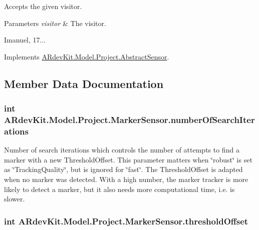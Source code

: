 Accepts the given visitor. 


\begin{DoxyParams}{Parameters}
{\em visitor} & The visitor.\\
\hline
\end{DoxyParams}


Imanuel, 17... 

Implements \hyperlink{class_a_rdev_kit_1_1_model_1_1_project_1_1_abstract_sensor_a4ff825b76bdd9f01a93ca670d02c219c}{A\-Rdev\-Kit.\-Model.\-Project.\-Abstract\-Sensor}.



\subsection{Member Data Documentation}
\hypertarget{class_a_rdev_kit_1_1_model_1_1_project_1_1_marker_sensor_aaefe31873d64fdae7c9518487f0ad0d1}{
\subsubsection[{number\-Of\-Search\-Iterations}]{\setlength{\rightskip}{0pt plus 5cm}int A\-Rdev\-Kit.\-Model.\-Project.\-Marker\-Sensor.\-number\-Of\-Search\-Iterations\hspace{0.3cm}{\ttfamily [protected]}}}\label{class_a_rdev_kit_1_1_model_1_1_project_1_1_marker_sensor_aaefe31873d64fdae7c9518487f0ad0d1}


Number of search iterations which controls the number of attempts to find a marker with a new Threshold\-Offset. This parameter matters when \char`\"{}robust\char`\"{} is set as \char`\"{}\-Tracking\-Quality\char`\"{}, but is ignored for \char`\"{}fast\char`\"{}. The Threshold\-Offset is adapted when no marker was detected. With a high number, the marker tracker is more likely to detect a marker, but it also needs more computational time, i.\-e. is slower. 

\hypertarget{class_a_rdev_kit_1_1_model_1_1_project_1_1_marker_sensor_ad80a6fc2821f265fc4c0583d0a66dfa7}{
\subsubsection[{threshold\-Offset}]{\setlength{\rightskip}{0pt plus 5cm}int A\-Rdev\-Kit.\-Model.\-Project.\-Marker\-Sensor.\-threshold\-Offset\hspace{0.3cm}{\ttfamily [protected]}}}\label{class_a_rdev_kit_1_1_model_1_1_project_1_1_marker_sensor_ad80a6fc2821f265fc4c0583d0a66dfa7}


